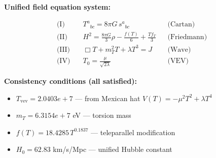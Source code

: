 
\textbf{Unified field equation system:}

\begin{align}
  \text{(I)} \quad & T^a{}_{bc} = 8\pi G \, s^a{}_{bc} && \text{(Cartan)} \\
  \text{(II)} \quad & H^2 = \frac{8\pi G}{3}\rho - \frac{f(T)}{6} + \frac{Tf_T}{3} && \text{(Friedmann)} \\
  \text{(III)} \quad & \Box T + m_T^2 T + \lambda T^3 = J && \text{(Wave)} \\
  \text{(IV)} \quad & T_0 = \frac{\mu}{\sqrt{2\lambda}} && \text{(VEV)}
\end{align}

\textbf{Consistency conditions (all satisfied):}
\begin{itemize}
  \item $T_{\text{vev}} = 2.0403e+7$ — from Mexican hat $V(T) = -\mu^2 T^2 + \lambda T^4$
  \item $m_T = 6.3154e+7$ eV — torsion mass
  \item $f(T) = 18.4285 \, T^{0.1837}$ — teleparallel modification
  \item $H_0 = 62.83$ km/s/Mpc — unified Hubble constant
\end{itemize}